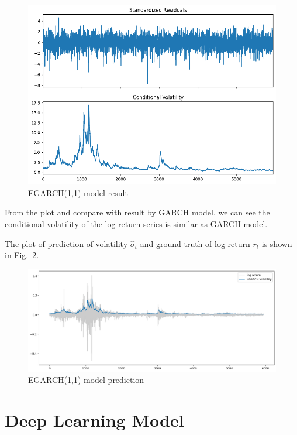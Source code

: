 \documentclass[runningheads]{llncs}
\begin{document}
\begin{figure}[htbp]
    \centering
    \includegraphics[width=\textwidth]{../img/egarch_result.png}
    \caption{EGARCH(1,1) model result}
    \label{fig:12}
\end{figure}

From the plot and compare with result by GARCH model, we can see the conditional volatility of the log return series is similar as GARCH model. 

The plot of prediction of volatility $\hat{\sigma}_t$ and ground truth of log return $r_t$ is shown in Fig.~\ref{fig:13}.


\begin{figure}[htbp]
    \centering
    \includegraphics[width=\textwidth]{../img/egarch_train_pred.png}
    \caption{EGARCH(1,1) model prediction}
    \label{fig:13}
\end{figure}

\section{Deep Learning Model}
\end{document}
